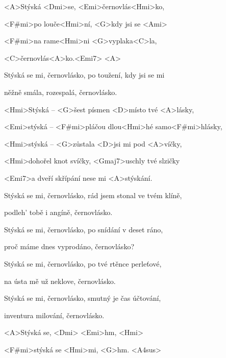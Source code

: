 

\zs
<A>Stýská <Dmi>se, <Emi>černovlás<Hmi>ko,

<F#mi>po louče<Hmi>ní, <G>kdy jsi se <Ami>

<F#mi>na rame<Hmi>ni <G>vyplaka<C>la,

<C>černovlás<A>ko.<Emi7> <A>
\ks

\zs
Stýská se mi, černovlásko, po toužení, kdy jsi se mi

něžně smála, rozespalá, černovlásko.
\ks

\zr
<Hmi>Stýská -- <G>šest písmen <D>místo tvé <A>lásky,

<Emi>stýská -- <F#mi>pláčou dlou<Hmi>hé samo<F#mi>hlásky,

<Hmi>stýská -- <G>zůstala <D>jsi mi pod <A>víčky,

<Hmi>dohořel knot svíčky, <Gmaj7>uschly tvé slzičky

<Emi7>a dveří skřípání nese mi <A>stýskání.
\kr

\zs
Stýská se mi, černovlásko, rád jsem stonal ve tvém klíně,

podleh' tobě i angíně, černovlásko.
\ks

\zs
Stýská se mi, černovlásko, po snídání v deset ráno,

proč máme dnes vyprodáno, černovlásko?
\ks


\zr \kr


\zs
Stýská se mi, černovlásko, po tvé rtěnce perleťové,

na ústa mě už neklove, černovlásko.
\ks

\zs
Stýská se mi, černovlásko, smutný je čas účtování,

inventura milování, černovlásko.
\ks

\zr \kr

\zr
<A>Stýská se, <Dmi> <Emi>hm, <Hmi>

<F#mi>stýská se <Hmi>mi, <G>hm. <A4sus>
\kr

\kp
